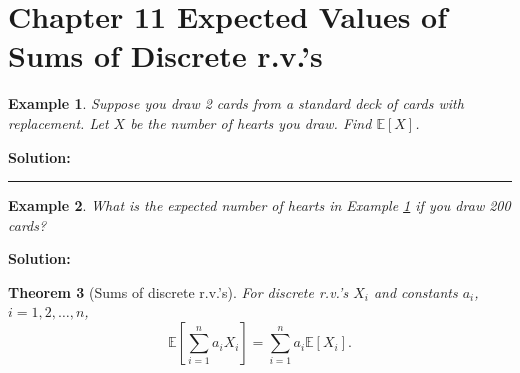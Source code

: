 \documentclass[12pt]{amsart}
\newtheorem{theorem}{Theorem}[section]
\newtheorem{example}[theorem]{Example}
\begin{document}
\setcounter{section}{11}
{\huge  
\section*{Chapter 11 \newline Expected Values of Sums of Discrete r.v.'s}
}

{\large 

\vspace{1cm}


\begin{example}\label{Draw2Cards}
Suppose you draw 2 cards from a standard deck of cards \textit{with} replacement. \newline
Let $X$ be the number of hearts you draw. Find $\mathbb{E}[X]$.

\end{example}

\textbf{Solution:}


\vspace{8cm}
\hrule
\vspace{.5cm}

\begin{example}\label{Draw200Cards}
What is the expected number of hearts in Example \ref{Draw2Cards} if you draw 200 cards?

\end{example}

\textbf{Solution:}





\newpage

\begin{theorem}[Sums of discrete r.v.'s]\label{ThmSumsRVE}
For discrete r.v.'s $X_i$ and constants $a_i$, $i=1,2,\dots, n$, 
$$
\mathbb{E}[\sum_{i=1}^n a_iX_i] = \sum_{i=1}^n a_i\mathbb{E}[X_i] .
$$ 
\end{theorem}

}
\end{document}
